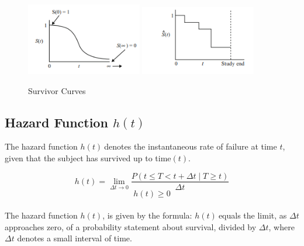 \documentclass[doublespacing,12pt]{report}
\begin{document}
\begin{figure}[H]
    \centering
    \includegraphics[width=0.45\textwidth]{Figure 3/3.31.png}
    \hfill
    \includegraphics[width=0.45\textwidth]{Figure 3/3.32.png}
    \caption{Survivor Curves}
    \label{Figure 3.3}
\end{figure}



\subsection{\texorpdfstring{Hazard Function \( h(t) \)}{Hazard Function h(t)}}

The hazard function \( h(t)\ \)denotes the instantaneous rate of failure at time \(t\), given that the subject has survived up to time\( (t).\)

\begin{equation}
h(t) = \lim_{\Delta t \to 0} \frac{P(t \le T < t + \Delta t \mid T \geq t)}{\Delta t}
\end{equation}
\begin{equation}
h\left(t\right)\geq0
\end{equation}\\
The hazard function \( h\left(t\right)\), is given by the formula: \(h\left(t\right)\ \)equals the limit, as \(\Delta t \) approaches zero, of a probability statement about survival, divided by \(\Delta t\), where \(\Delta t\) denotes a small interval of time.
\end{document}
